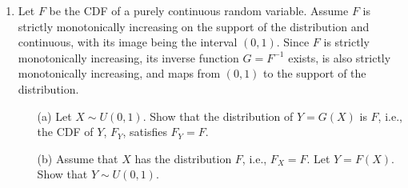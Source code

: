 \documentclass[12pt]{article}
\begin{document}
\begin{enumerate}
        \vspace{0.5cm}

    \item Let $F$ be the CDF of a purely continuous random variable. Assume $F$ is strictly monotonically increasing on the support of the distribution and continuous, with its image being the interval $(0,1)$. Since $F$ is strictly monotonically increasing, its inverse function $G = F^{-1}$ exists, is also strictly monotonically increasing, and maps from $(0,1)$ to the support of the distribution.
        \begin{enumerate}
            \item[(a)] Let $X \sim U(0,1)$. Show that the distribution of $Y = G(X)$ is $F$, i.e., the CDF of $Y$, $F_Y$, satisfies $F_Y = F$.
            \item[(b)] Assume that $X$ has the distribution $F$, i.e., $F_X = F$. Let $Y = F(X)$. Show that $Y \sim U(0,1)$.
        \end{enumerate}

\end{enumerate}
\end{document}
